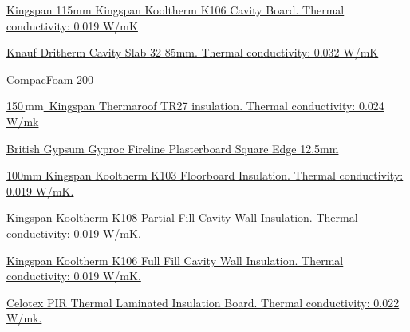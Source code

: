 \documentclass{extension}
\newcommand{\mm}{\,$\mathrm{mm}$}
\begin{document}
\begin{thebibliography}{9}
 \href{https://www.jewson.co.uk/p/kingspan-kooltherm-k106-cavity-board-1200-x-450-x-115mm-pack-of-4-IK106115} {Kingspan 115mm Kingspan Kooltherm K106 Cavity Board. Thermal conductivity: 0.019 W/mK}

 \href{https://www.travisperkins.co.uk/cavity-and-internal-wall-insulation/knauf-dritherm-cavity-slab-32-85mm-455-x-1200mm-2-73m2-per-pack/p/848626?gclid=Cj0KCQjw7aqkBhDPARIsAKGa0oIWRlMly_UsJOFDSrQJAOasgPovH9dFJJFFpmnhtPwcoliCuB8_0a4aAik4EALw_wcB&gclsrc=aw.ds} {Knauf Dritherm Cavity Slab 32 85mm. Thermal conductivity: 0.032 W/mK}

 \href{https://www.greenbuildingstore.co.uk/products/compacfoam-200/} {CompacFoam 200}

 \href{https://www.kingspan.com/gb/en/products/insulation-boards/roof-insulation-boards/thermaroof-tr27/?s=t} {150\mm\ Kingspan Thermaroof TR27 insulation. Thermal conductivity: 0.024 W/mk}

 \href{https://www.travisperkins.co.uk/fire-resistant-boards/british-gypsum-gyproc-fireline-plasterboard-square-edge-1800mm-x-900mm-x-12-5mm/p/751327} {British Gypsum Gyproc Fireline Plasterboard Square Edge 12.5mm}

 \href{https://www.travisperkins.co.uk/clearance/kingspan-kooltherm-k103-floorboard-insulation-2400mm-x-1200mm-x-100mm/p/881325?gclid=Cj0KCQjw1rqkBhCTARIsAAHz7K2E9ooPCpF4RrujHbchcasSMCTRRTU6P8Dr64iUsAXokloK77zFv8MaAq83EALw_wcB&gclsrc=aw.ds} {100mm Kingspan Kooltherm K103 Floorboard Insulation. Thermal conductivity: 0.019 W/mK.}

 \href{https://www.travisperkins.co.uk/clearance/kingspan-kooltherm-k108-cavity-insulation-board-1200-x-450-x-100mm/p/187808} {Kingspan Kooltherm K108 Partial Fill Cavity Wall Insulation. Thermal conductivity: 0.019 W/mK.}

 \href{https://www.travisperkins.co.uk/cavity-and-internal-wall-insulation/kingspan-kooltherm-k106-full-fill-cavity-wall-insulation-board-1200mm-x-450mm-x-90mm/p/881334?gclid=Cj0KCQjw1rqkBhCTARIsAAHz7K1HaYzk6zlqoV5iMFNUApx5VJQI_11hfpoJTWEc27A7wdo-6fuiQZ8aAk30EALw_wcB&gclsrc=aw.ds} {Kingspan Kooltherm K106 Full Fill Cavity Wall Insulation. Thermal conductivity: 0.019 W/mK.}

 \href{https://www.travisperkins.co.uk/thermal-insulated-plasterboard/celotex-pir-thermal-laminated-insulation-board-2400mm-x-1200mm-x-40mm-52-5mm-overall/p/778057} {Celotex PIR Thermal Laminated Insulation Board. Thermal conductivity: 0.022 W/mk.}

\end{thebibliography}
\end{document}
